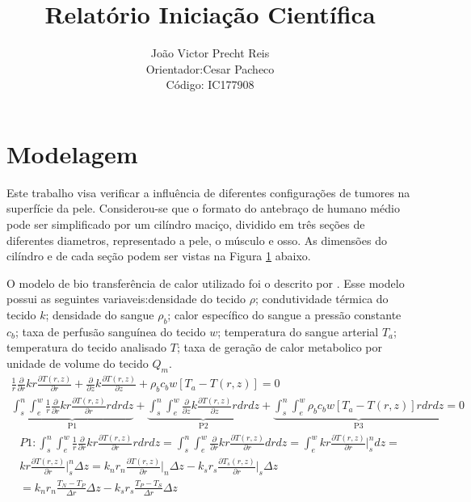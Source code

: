 \documentclass[11pt]{extarticle}
\title{Relat\'orio Inicia\c{c}\~ao Cient\'ifica}
\author{Jo\~ao Victor Precht Reis \\ Orientador:Cesar Pacheco\\
Código: IC177908}
\begin{document}
\section{Modelagem}
Este trabalho  visa verificar a influência de diferentes configurações de tumores na superfície da pele. Considerou-se que o formato do antebraço de humano médio pode ser simplificado por um cilíndro maciço, dividido em três seções de diferentes diametros, representado a pele, o músculo e osso. As dimensões do cilíndro e de cada seção podem ser vistas na Figura \ref{fig:geometria} abaixo.


\begin{figure}[h!]
	\centering
	\caption{ \label{fig:geometria}}
\end{figure}


O modelo de bio transferência de calor utilizado foi o descrito por . Esse modelo possui as seguintes variaveis:densidade do tecido $\rho$; condutividade térmica do tecido $k$; densidade do sangue $\rho_b$; calor específico do sangue a pressão constante $c_b$; taxa de perfusão sanguínea do tecido $w$; temperatura do sangue arterial $T_a$; temperatura do tecido analisado $T$; taxa de geração de calor metabolico por unidade de volume do tecido $Q_m$.
\begin{gather}
\frac{1}{r}\frac{\partial}{\partial r}k r \frac{\partial T(r,z)}{\partial r}+\frac{\partial}{\partial z}k\frac{\partial T(r,z)}{\partial z} +\rho_b c_b w [T_a-T(r,z)]=0 \\
\underbrace{\int_{s}^{n} \int_{e}^{w} \frac{1}{r}\frac{\partial}{\partial r}k r \frac{\partial T(r,z)}{\partial r}rdrdz}_\text{P1}    +\underbrace{\int_{s}^{n} \int_{e}^{w} \frac{\partial}{\partial z}k\frac{\partial T(r,z)}{\partial z} rdrdz}_\text{P2}    +\underbrace{\int_{s}^{n} \int_{e}^{w} \rho_b c_b w [T_a-T(r,z)]rdrdz}_\text{P3}  =0
\end{gather}
\begin{gather}
P1:\int_{s}^{n} \int_{e}^{w} \frac{1}{r}\frac{\partial}{\partial r}k r \frac{\partial T(r,z)}{\partial r}rdrdz=\int_{s}^{n} \int_{e}^{w} \frac{\partial}{\partial r}k r \frac{\partial T(r,z)}{\partial r}drdz=\int_{e}^{w} k r \frac{\partial T(r,z)}{\partial r} \biggr\rvert^{n}_{s} dz= \\
k r \frac{\partial T(r,z)}{\partial r} \biggr\rvert^{n}_{s} \Delta z=   k_n r_n \frac{\partial T(r,z)}{\partial r}\biggr\rvert_{n}\Delta z-k_s r_s \frac{\partial T_s(r,z)}{\partial r}\biggr\rvert_{s}\Delta z\\
=k_n r_n \frac{T_N-T_P}{\Delta r}\Delta z-k_s r_s  \frac{T_P-T_S}{\Delta r}\Delta z 
\end{gather} 
\end{document}
